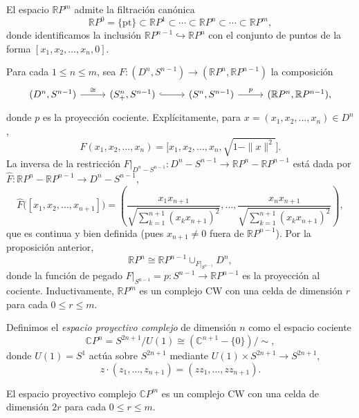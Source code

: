 \begin{dem}
El espacio $\mathbb{R}P^m$ admite la filtración canónica
\[
\mathbb{R}P^0 = \{\mathrm{pt}\} \subset \mathbb{R}P^1 \subset \cdots \subset \mathbb{R}P^n \subset \cdots \subset \mathbb{R}P^m,
\]
donde identificamos la inclusión $\mathbb{R}P^{n-1} \hookrightarrow \mathbb{R}P^n$ con el conjunto de puntos de la forma $[x_1, x_2, \dots, x_n, 0]$.

Para cada $1 \leq n \leq m$, sea $F \colon (D^n, S^{n-1}) \to (\mathbb{R}P^n, \mathbb{R}P^{n-1})$ la composición
\[
\begin{tikzcd}[column sep=2.6em]
(D^n, S^{n-1}) \arrow[r, "\cong"] & (S_+^n, S^{n-1}) \arrow[r, hook] & (S^n, S^{n-1}) \arrow[r, "p"] & (\mathbb{R}P^n, \mathbb{R}P^{n-1}),
\end{tikzcd}
\]
donde $p$ es la proyección cociente. Explícitamente, para $x = (x_1, x_2, \dots, x_n) \in D^n$,
\[
F(x_1, x_2, \dots, x_n) = \bigl[x_1, x_2, \dots, x_n, \sqrt{1 - \|x\|^2}\bigr].
\]
La inversa de la restricción $F|_{D^n - S^{n-1}} \colon D^n - S^{n-1} \to \mathbb{R}P^n - \mathbb{R}P^{n-1}$ está dada por $\hat{F} \colon \mathbb{R}P^n - \mathbb{R}P^{n-1} \to D^n - S^{n-1}$,
\[
\hat{F}\bigl([x_1, x_2, \dots, x_{n+1}]\bigr) =
\left(
\frac{x_1 x_{n+1}}{\sqrt{\sum_{k=1}^{n+1} (x_k x_{n+1})^2}}, \dots,
\frac{x_n x_{n+1}}{\sqrt{\sum_{k=1}^{n+1} (x_k x_{n+1})^2}}
\right),
\]
que es continua y bien definida (pues $x_{n+1} \neq 0$ fuera de $\mathbb{R}P^{n-1}$). Por la proposición anterior,
\[
\mathbb{R}P^n \cong \mathbb{R}P^{n-1} \cup_{F|_{S^{n-1}}} D^n,
\]
donde la función de pegado $F|_{S^{n-1}} = p \colon S^{n-1} \to \mathbb{R}P^{n-1}$ es la proyección al cociente. Inductivamente, $\mathbb{R}P^m$ es un complejo CW con una celda de dimensión $r$ para cada $0 \leq r \leq m$.
\end{dem}

\begin{definicion}
Definimos el \textit{espacio proyectivo complejo} de dimensión $n$ como el espacio cociente
\[
\mathbb{C}P^n = S^{2n+1} / U(1) \cong (\mathbb{C}^{n+1} - \{0\}) / {\sim},
\]
donde $U(1) = S^1$ actúa sobre $S^{2n+1}$ mediante $U(1) \times S^{2n+1} \to S^{2n+1}$,
\[
z \cdot (z_1, \dots, z_{n+1}) = (z z_1, \dots, z z_{n+1}).
\]
\end{definicion}

\begin{lema}
El espacio proyectivo complejo $\mathbb{C}P^m$ es un complejo CW con una celda de dimensión $2r$ para cada $0 \leq r \leq m$.
\end{lema}


